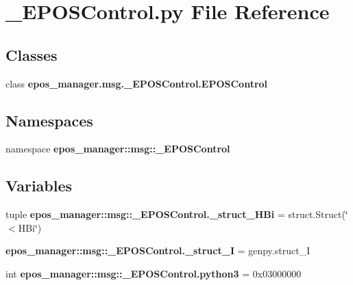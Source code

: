 \section{\-\_\-\-E\-P\-O\-S\-Control.\-py \-File \-Reference}
\label{__EPOSControl_8py}
\subsection*{\-Classes}
\begin{DoxyCompactItemize}
\item 
class {\bf epos\-\_\-manager.\-msg.\-\_\-\-E\-P\-O\-S\-Control.\-E\-P\-O\-S\-Control}
\end{DoxyCompactItemize}
\subsection*{\-Namespaces}
\begin{DoxyCompactItemize}
\item 
namespace {\bf epos\-\_\-manager\-::msg\-::\-\_\-\-E\-P\-O\-S\-Control}
\end{DoxyCompactItemize}
\subsection*{\-Variables}
\begin{DoxyCompactItemize}
\item 
tuple {\bf epos\-\_\-manager\-::msg\-::\-\_\-\-E\-P\-O\-S\-Control.\-\_\-struct\-\_\-\-H\-Bi} = struct.\-Struct(\char`\"{}$<$\-H\-Bi\char`\"{})
\item 
{\bf epos\-\_\-manager\-::msg\-::\-\_\-\-E\-P\-O\-S\-Control.\-\_\-struct\-\_\-\-I} = genpy.\-struct\-\_\-\-I
\item 
int {\bf epos\-\_\-manager\-::msg\-::\-\_\-\-E\-P\-O\-S\-Control.\-python3} = 0x03000000
\end{DoxyCompactItemize}
